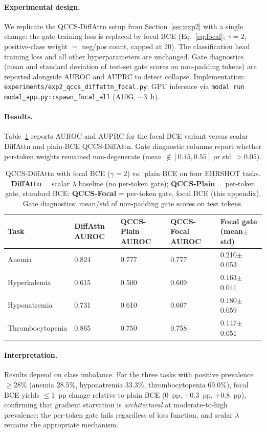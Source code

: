 \documentclass{article}
\begin{document}
\paragraph{Experimental design.}
We replicate the QCCS-DiffAttn setup from Section~\ref{sec:exp2} with a
single change: the gate training loss is replaced by focal BCE
(Eq.~\ref{eq:focal}; $\gamma=2$, positive-class weight $=$ neg/pos count,
capped at 20). The classification head training loss and all other
hyperparameters are unchanged. Gate diagnostics (mean and standard deviation
of test-set gate scores on non-padding tokens) are reported alongside AUROC
and AUPRC to detect collapse. Implementation:
\texttt{experiments/exp2\_qccs\_diffattn\_focal.py}; GPU inference via
\texttt{modal run modal\_app.py::spawn\_focal\_all} (A10G, $\sim$3~h).

\paragraph{Results.}
Table~\ref{tab:focal} reports AUROC and AUPRC for the focal BCE variant
versus scalar DiffAttn and plain-BCE QCCS-DiffAttn. Gate diagnostic columns
report whether per-token weights remained non-degenerate (mean $\notin [0.45, 0.55]$
or std $> 0.05$).

\begin{table}[H]
\centering
\caption{QCCS-DiffAttn with focal BCE ($\gamma=2$) vs.\ plain BCE on
  four EHRSHOT tasks. \textbf{DiffAttn} = scalar $\lambda$ baseline (no per-token gate);
  \textbf{QCCS-Plain} = per-token gate, standard BCE; \textbf{QCCS-Focal} =
  per-token gate, focal BCE (this appendix).
  Gate diagnostics: mean/std of non-padding gate scores on test tokens.}
\label{tab:focal}
\small
\begin{tabular}{@{}lp{2.0cm}p{2.0cm}p{2.5cm}p{2.2cm}@{}}
\toprule
Task & DiffAttn AUROC & QCCS-Plain AUROC & QCCS-Focal AUROC & Focal gate (mean$\pm$std) \\
\midrule
Anemia         & 0.824 & 0.777 & 0.777 & 0.210$\pm$0.053 \\
Hyperkalemia   & 0.615 & 0.500 & 0.609 & 0.163$\pm$0.041 \\
Hyponatremia   & 0.731 & 0.610 & 0.607 & 0.180$\pm$0.059 \\
Thrombocytopenia & 0.865 & 0.750 & 0.758 & 0.147$\pm$0.051 \\
\bottomrule
\end{tabular}
\end{table}

\paragraph{Interpretation.}
Results depend on class imbalance.
For the three tasks with positive prevalence $\geq$28\% (anemia 28.5\%, hyponatremia
33.3\%, thrombocytopenia 69.0\%), focal BCE yields $\leq$1~pp change relative to
plain BCE (0~pp, $-$0.3~pp, $+$0.8~pp), confirming that gradient starvation is
\emph{architectural} at moderate-to-high prevalence: the per-token gate fails
regardless of loss function, and scalar $\lambda$ remains the appropriate mechanism.
\end{document}
